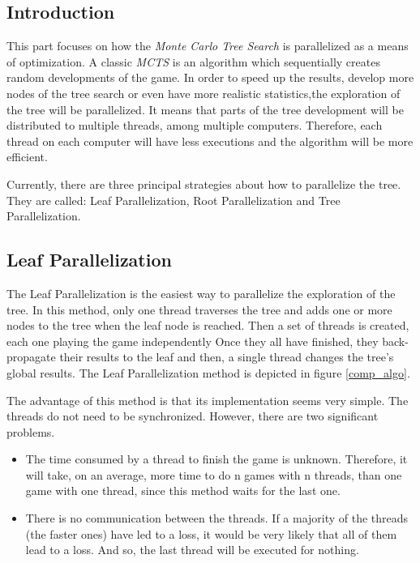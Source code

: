 \label{third part}
\subsection{Introduction}

This part focuses on how the \emph{Monte Carlo Tree Search} is parallelized as a means of optimization. A classic \emph{MCTS} is an algorithm which sequentially creates random developments of the game. In order to speed up the results, develop more nodes of the tree search or even have more realistic statistics,the exploration of the tree will be parallelized. It means that parts of the tree development will be distributed to multiple threads, among multiple computers. Therefore, each thread on each computer will have less executions and the algorithm will be more efficient.
\newline
\newline

Currently, there are three principal strategies about how to parallelize the tree. They are called: Leaf Parallelization, Root Parallelization and Tree Parallelization\cite{parallel_comp, master_mcts_kozeleck}.

\subsection{Leaf Parallelization}
\label{sec:leaf}

The Leaf Parallelization is the easiest way to parallelize the exploration of the tree. In this method, only one thread traverses the tree and adds one or more nodes to the tree when the leaf node is reached. Then a set of threads is created, each one playing the game independently Once they all have finished, they back-propagate their results to the leaf and then, a single thread changes the tree’s global results. The Leaf Parallelization method is depicted in figure \ref{comp_algo}.
\newline
\newline

The advantage of this method is that its implementation seems very simple. The threads do not need to be synchronized. However, there are two significant problems.
\begin{itemize}
     \item The time consumed by a thread to finish the game is unknown. Therefore, it will take, on an average, more time to do n games with n threads, than one game with one thread, since this method waits for the last one.
     \item There is no communication between the threads. If a majority of the threads (the faster ones) have led to a loss, it would be very likely that all of them lead to a loss. And so, the last thread will be executed for nothing. 
  \end{itemize}


